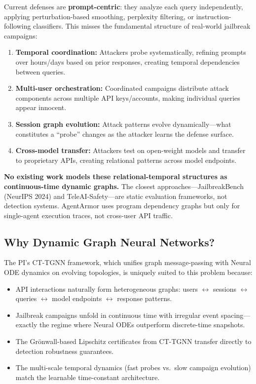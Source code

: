 \documentclass[12pt,a4paper]{article}
\begin{document}
Current defenses are \textbf{prompt-centric}: they analyze each query independently, applying perturbation-based smoothing, perplexity filtering, or instruction-following classifiers. This misses the fundamental structure of real-world jailbreak campaigns:

\begin{enumerate}
    \item \textbf{Temporal coordination:} Attackers probe systematically, refining prompts over hours/days based on prior responses, creating temporal dependencies between queries.
    \item \textbf{Multi-user orchestration:} Coordinated campaigns distribute attack components across multiple API keys/accounts, making individual queries appear innocent.
    \item \textbf{Session graph evolution:} Attack patterns evolve dynamically---what constitutes a ``probe'' changes as the attacker learns the defense surface.
    \item \textbf{Cross-model transfer:} Attackers test on open-weight models and transfer to proprietary APIs, creating relational patterns across model endpoints.
\end{enumerate}

\textbf{No existing work models these relational-temporal structures as continuous-time dynamic graphs.} The closest approaches---JailbreakBench (NeurIPS 2024) and TeleAI-Safety---are static evaluation frameworks, not detection systems. AgentArmor uses program dependency graphs but only for single-agent execution traces, not cross-user API traffic.

\subsection{Why Dynamic Graph Neural Networks?}

The PI's CT-TGNN framework, which unifies graph message-passing with Neural ODE dynamics on evolving topologies, is uniquely suited to this problem because:

\begin{itemize}
    \item API interactions naturally form heterogeneous graphs: users $\leftrightarrow$ sessions $\leftrightarrow$ queries $\leftrightarrow$ model endpoints $\leftrightarrow$ response patterns.
    \item Jailbreak campaigns unfold in continuous time with irregular event spacing---exactly the regime where Neural ODEs outperform discrete-time snapshots.
    \item The Gr\"onwall-based Lipschitz certificates from CT-TGNN transfer directly to detection robustness guarantees.
    \item The multi-scale temporal dynamics (fast probes vs.\ slow campaign evolution) match the learnable time-constant architecture.
\end{itemize}
\end{document}

